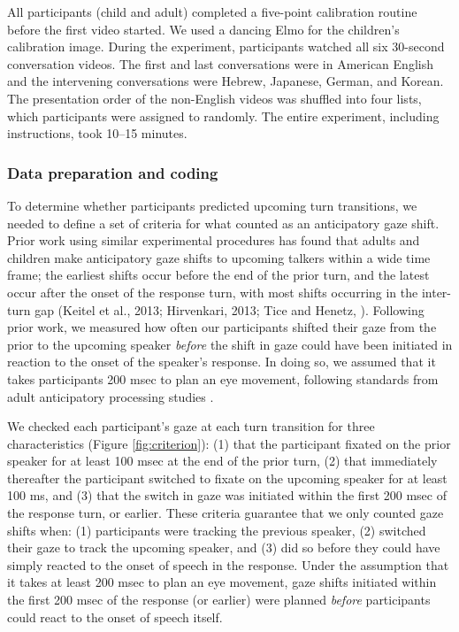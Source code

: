 \documentclass[authoryear, 12pt]{elsarticle}
\begin{document}
All participants (child and adult) completed a five-point calibration routine before the first video started. We used a dancing Elmo for the children's calibration image. During the experiment, participants watched all six 30-second conversation videos. The first and last conversations were in American English and the intervening conversations were Hebrew, Japanese, German, and Korean. The presentation order of the non-English videos was shuffled into four lists, which participants were assigned to randomly. The entire experiment, including instructions, took 10--15 minutes.

\subsubsection*{Data preparation and coding}
\label{sec:algorithm}

To determine whether participants predicted upcoming turn transitions, we needed to define a set of criteria for what counted as an anticipatory gaze shift. Prior work using similar experimental procedures has found that adults and children make anticipatory gaze shifts to upcoming talkers within a wide time frame; the earliest shifts occur before the end of the prior turn, and the latest occur after the onset of the response turn, with most shifts occurring in the inter-turn gap (Keitel et al., 2013; Hirvenkari, 2013; Tice and Henetz, \citeyear{TiceHenetz11}). Following prior work, we measured how often our participants shifted their gaze from the prior to the upcoming speaker \textit{before} the shift in gaze could have been initiated in reaction to the onset of the speaker's response. In doing so, we assumed that it takes participants 200 msec to plan an eye movement, following standards from adult anticipatory processing studies \citep[e.g., ][]{kamide2003}.

We checked each participant's gaze at each turn transition for three characteristics (Figure \ref{fig:criterion}): (1) that the participant fixated on the prior speaker for at least 100 msec at the end of the prior turn, (2) that immediately thereafter the participant switched to fixate on the upcoming speaker for at least 100 ms, and (3) that the switch in gaze was initiated within the first 200 msec of the response turn, or earlier. These criteria guarantee that we only counted gaze shifts when: (1) participants were tracking the previous speaker, (2) switched their gaze to track the upcoming speaker, and (3) did so before they could have simply reacted to the onset of speech in the response. Under the assumption that it takes at least 200 msec to plan an eye movement, gaze shifts initiated within the first 200 msec of the response (or earlier) were planned \textit{before} participants could react to the onset of speech itself.
\end{document}
